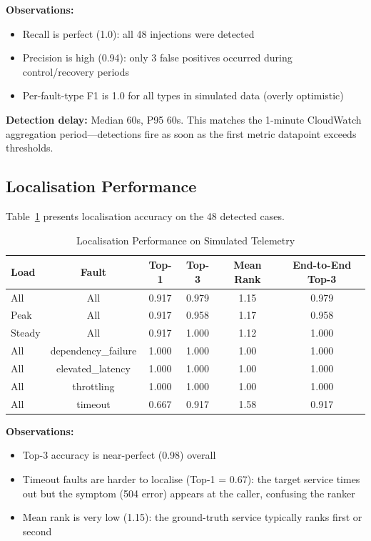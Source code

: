 \textbf{Observations:}
\begin{itemize}
    \item Recall is perfect (1.0): all 48 injections were detected
    \item Precision is high (0.94): only 3 false positives occurred during control/recovery periods
    \item Per-fault-type F1 is 1.0 for all types in simulated data (overly optimistic)
\end{itemize}

\textbf{Detection delay:} Median 60s, P95 60s. This matches the 1-minute CloudWatch aggregation period—detections fire as soon as the first metric datapoint exceeds thresholds.

\subsection{Localisation Performance}

Table~\ref{tab:localisation_sim} presents localisation accuracy on the 48 detected cases.

\begin{table}[h]
\centering
\caption{Localisation Performance on Simulated Telemetry}
\label{tab:localisation_sim}
\begin{tabular}{lccccc}
\hline
\textbf{Load} & \textbf{Fault} & \textbf{Top-1} & \textbf{Top-3} & \textbf{Mean Rank} & \textbf{End-to-End Top-3} \\
\hline
All & All & 0.917 & 0.979 & 1.15 & 0.979 \\
Peak & All & 0.917 & 0.958 & 1.17 & 0.958 \\
Steady & All & 0.917 & 1.000 & 1.12 & 1.000 \\
\hline
All & dependency\_failure & 1.000 & 1.000 & 1.00 & 1.000 \\
All & elevated\_latency & 1.000 & 1.000 & 1.00 & 1.000 \\
All & throttling & 1.000 & 1.000 & 1.00 & 1.000 \\
All & timeout & 0.667 & 0.917 & 1.58 & 0.917 \\
\hline
\end{tabular}
\end{table}

\textbf{Observations:}
\begin{itemize}
    \item Top-3 accuracy is near-perfect (0.98) overall
    \item Timeout faults are harder to localise (Top-1 = 0.67): the target service times out but the symptom (504 error) appears at the caller, confusing the ranker
    \item Mean rank is very low (1.15): the ground-truth service typically ranks first or second
\end{itemize}

